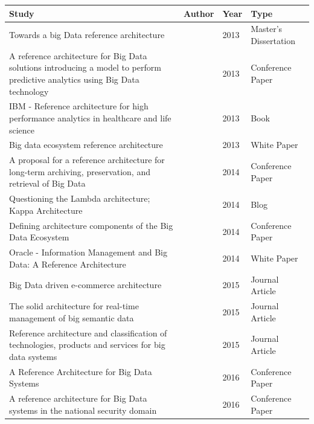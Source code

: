 \documentclass[review]{elsarticle}
\begin{document}
    \begin{longtable}{|p{5cm} | p{1cm}  | p{1cm} | p{3.4cm}|}
     \hline
     Study  & Author & Year & Type \\ [0.5ex]
     \hline
     Towards a big Data reference architecture  & \cite{Maier}& 2013 & Master's Dissertation \\
     \hline
     A reference architecture for Big Data solutions introducing a model to perform predictive analytics using Big Data technology  & \cite{geerdink2013reference}  & 2013 & Conference Paper \\
     \hline
     IBM - Reference architecture for high performance analytics in healthcare and life science  & \cite{quintero2019ibm} & 2013 & Book \\ [1ex]
     \hline
     Big data ecosystem reference architecture  &
     \cite{levin2013big} & 2013 & White Paper \\ [1ex]
     \hline
     A proposal for a reference architecture for long-term archiving, preservation, and retrieval of Big Data  & \cite{viana2014proposal}  & 2014 & Conference Paper \\
     \hline
     Questioning the Lambda architecture; Kappa Architecture  & \cite{kreps2014questioning}  & 2014 & Blog \\
     \hline
     Defining architecture components of the Big Data Ecosystem  & \cite{demchenko2014defining} & 2014 & Conference Paper   \\ [1ex]
     \hline
     Oracle - Information Management and Big Data: A Reference Architecture   &
     \cite{cackett2013information} & 2014 & White Paper \\ [1ex]
     \hline
     Big Data driven e-commerce architecture   & \cite{ghandour2015big} & 2015 & Journal Article \\ [1ex]
     \hline
     The solid architecture for real-time management of big semantic data & \cite{martinez2015solid} & 2015 &  Journal Article \\ [1ex]
     \hline
     Reference architecture and classification of technologies, products and services for big data systems  & \cite{paakkonen2015reference}  & 2015 & Journal Article \\ [1ex]
     \hline
     A Reference Architecture for Big Data Systems  & \cite{sang2016reference}  & 2016 & Conference Paper  \\
     \hline
     A reference architecture for Big Data systems in the national security domain  & \cite{klein2016reference}  & 2016 & Conference Paper \\ [1ex]

\end{longtable}
\end{document}
